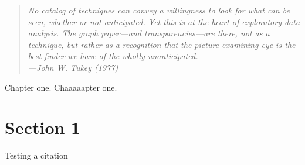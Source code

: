 \begin{quote} 
\begin{singlespace}
\textit{No catalog of techniques can convey a willingness to look for what can be seen, whether or not anticipated. Yet this is at the heart of exploratory data analysis. The graph paper---and transparencies---are there, not as a technique, but rather as a recognition that the picture-examining eye is the best finder we have of the wholly unanticipated. \\
---John W. Tukey (1977)}
\end{singlespace}
\end{quote}

Chapter one. Chaaaaapter one.

\section{Section 1}

Testing a citation\citep{novembre2008europe}